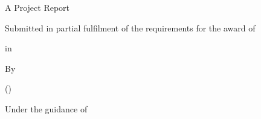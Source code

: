 \begin{titlepage}
\centering
\vspace*{0.5cm}
{\Large\bfseries \UniversityName\par}
\vspace{0.4cm}
{\large \DepartmentName\par}
\vspace{1.8cm}
{\huge\bfseries \ThesisTitle\par}
\vspace{1.2cm}
{\Large A Project Report\par}
\vspace{0.3cm}
{\large Submitted in partial fulfilment of the requirements for the award of\par}
\vspace{0.3cm}
{\Large\bfseries \DegreeName\par}
\vspace{0.3cm}
{\large in\par}
\vspace{0.3cm}
{\Large\bfseries \BranchName\par}
\vspace{1.8cm}
{\large By\par}
\vspace{0.4cm}
{\Large\bfseries \StudentName\par}
{\large (\StudentRoll)\par}
\vspace{1.2cm}
{\large Under the guidance of\par}
\vspace{0.3cm}
{\Large\bfseries \SupervisorName\par}
{\large \SupervisorDesignation\par}
\vspace{1.8cm}
{\large \SubmissionMonth\ \SubmissionYear\par}
\vfill
\end{titlepage}
